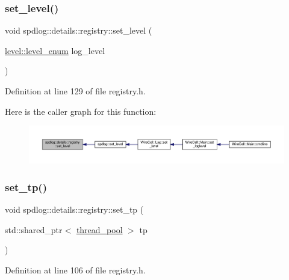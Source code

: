 \subsubsection{\texorpdfstring{set\+\_\+level()}{set\_level()}}
{\footnotesize\ttfamily void spdlog\+::details\+::registry\+::set\+\_\+level (\begin{DoxyParamCaption}\item[{\hyperlink{namespacespdlog_1_1level_a35f5227e5daf228d28a207b7b2aefc8b}{level\+::level\+\_\+enum}}]{log\+\_\+level }\end{DoxyParamCaption})\hspace{0.3cm}{\ttfamily [inline]}}



Definition at line 129 of file registry.\+h.

Here is the caller graph for this function\+:
\nopagebreak
\begin{figure}[H]
\begin{center}
\leavevmode
\includegraphics[width=350pt]{classspdlog_1_1details_1_1registry_a4b8494e781ed3151586b307cca63edb7_icgraph}
\end{center}
\end{figure}
\mbox{\label{classspdlog_1_1details_1_1registry_aa5503db04a70a06f97e7c1218aa8cbe2}} 
\subsubsection{\texorpdfstring{set\+\_\+tp()}{set\_tp()}}
{\footnotesize\ttfamily void spdlog\+::details\+::registry\+::set\+\_\+tp (\begin{DoxyParamCaption}\item[{std\+::shared\+\_\+ptr$<$ \hyperlink{classspdlog_1_1details_1_1thread__pool}{thread\+\_\+pool} $>$}]{tp }\end{DoxyParamCaption})\hspace{0.3cm}{\ttfamily [inline]}}



Definition at line 106 of file registry.\+h.


